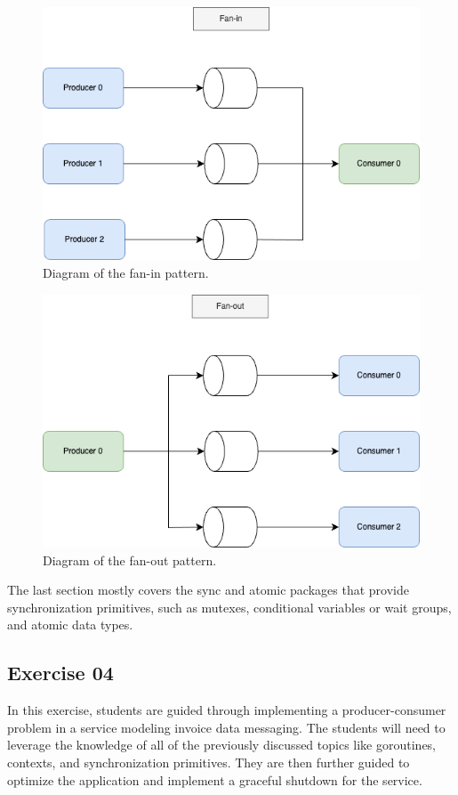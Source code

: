 \documentclass[
  digital,
  color,
  oneside,
  nosansbold,
  nocolorbold,
  nolof,
  nolot,
]{fithesis4}
\begin{document}
\begin{figure}[H]
    \centering
    \includegraphics[width=12cm]{figures/fanin.png}
    \caption{Diagram of the fan-in pattern.}
    \label{fig:fanin}
\end{figure}

\begin{figure}[H]
    \centering
    \includegraphics[width=12cm]{figures/fanout.png}
    \caption{Diagram of the fan-out pattern.}
    \label{fig:fanout}
\end{figure}

The last section mostly covers the sync and atomic packages that provide synchronization primitives, such as mutexes, conditional variables or wait groups, and atomic data types.

\subsection{Exercise 04}

In this exercise, students are guided through implementing a producer-consumer problem in a service modeling invoice data messaging. The students will need to leverage the knowledge of all of the previously discussed topics like goroutines, contexts, and synchronization primitives. They are then further guided to optimize the application and implement a graceful shutdown for the service.
\end{document}
